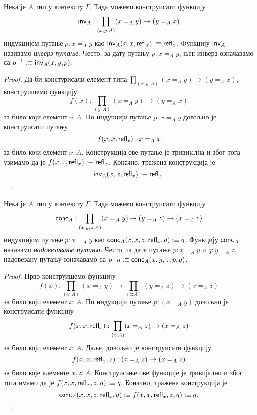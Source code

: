 \documentclass[12pt,oneside]{memoir}
\begin{document}
\begin{lemma}
    Нека је $A$ тип у контексту $\Gamma$. Тада можемо конструисати функцију \[\mathsf{inv}_{A} : \prod_{(x, y : A)} (x =_A y) \to (y =_A x)\] индукцијом путање $p : x =_A y$ као $\mathsf{inv}_{A} (x, x, \mathsf{refl}_{x}) :\equiv \mathsf{refl}_{x}$. Функцију $\mathsf{inv}_{A}$ називамо \emph{инверз путање}. Често, за дату путању $p : x =_A y$, њен инверз означавамо са $p^{-1} :\equiv \mathsf{inv}_{A}(x, y, p)$.
\end{lemma}
\begin{proof}
    Да би констурисали елемент типа $\prod_{(x,y : A)} (x =_A y) \to (y =_A x)$, конструишемо функцију \[ f(x) : \prod_{(y : A)} (x =_A y) \to (y =_A x)\] за било који елемент $x : A$. По индукцији путање $p : x =_A y$ довољно је конструисати путању \[ f(x, x, \mathsf{refl}_{x}) : x =_A x \] за било који елемент $x : A$. Конструкција ове путање је тривијална и због тога узимамо да је $f (x, x, \mathsf{refl}_{x}) :\equiv \mathsf{refl}_{x}$. Коначно, тражена конструкција је \[ \mathsf{inv}_{A} (x, x, \mathsf{refl}_{x}) :\equiv \mathsf{refl}_{x}. \] 
\end{proof}

\begin{lemma}
    Нека је $A$ тип у контексту $\Gamma$. Тада можемо конструисати функцију \[\mathsf{conc}_{A} : \prod_{(x, y, z : A)} (x =_A y) \to (y =_A z) \to (x =_A z)\] индукцијом путање $p : x =_A y$ као $\mathsf{conc}_{A} (x, x, z, \mathsf{refl}_{x}, q) :\equiv q$. Функцију $\mathsf{conc}_{A}$ називамо \emph{надовезивање путања}. Често, за дате путање $p : x =_A y$ и $q : y =_A z$, надовезану путању означавамо са $p \cdot q :\equiv \mathsf{conc}_{A} (x, y, z, p, q)$.
\end{lemma}
\begin{proof}
    Прво конструишемо функцију
    \[f(x) : \prod_{(y : A)} (x =_A y) \to \prod_{(z : A)} (y =_A z) \to (x =_A z)\] за било који елемент $x : A$. По индукцији путање $p : (x =_A y)$ довољно је конструисати функцију \[ f(x, x, \mathsf{refl}_{x}) : \prod_{(z : A)} (x =_A z) \to (x =_A z) \] за било који елемент $x : A$. Даље, довољно је конструисати функцију \[ f(x, x, \mathsf{refl}_{x}, z) : (x =_A z) \to (x =_A z) \] за било које елементе $x, z : A$. Конструисање ове функције је тривијално и због тога имамо да је $f(x, x, \mathsf{refl}_{x}, z, q) :\equiv q$. Коначно, тражена конструкција је \[\mathsf{conc}_{A}(x, x, z, \mathsf{refl}_{x}, q) :\equiv f(x, x, \mathsf{refl}_{x}, z, q) :\equiv q. \]
\end{proof}
\end{document}
